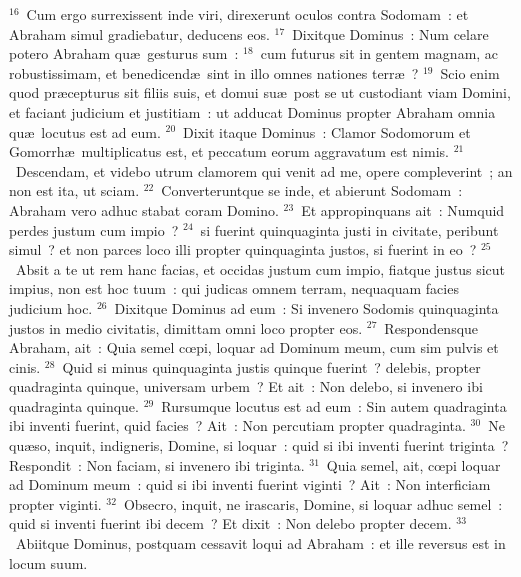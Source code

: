 ${}^{16}$~Cum ergo surrexissent inde viri, direxerunt oculos contra Sodomam~: et Abraham simul gradiebatur, deducens eos.
${}^{17}$~Dixitque Dominus~: Num celare potero Abraham qu\ae\ gesturus sum~:
${}^{18}$~cum futurus sit in gentem magnam, ac robustissimam, et benedicend\ae\ sint in illo omnes nationes terr\ae~?
${}^{19}$~Scio enim quod pr\ae cepturus sit filiis suis, et domui su\ae\ post se ut custodiant viam Domini, et faciant judicium et justitiam~: ut adducat Dominus propter Abraham omnia qu\ae\ locutus est ad eum.
${}^{20}$~Dixit itaque Dominus~: Clamor Sodomorum et Gomorrh\ae\ multiplicatus est, et peccatum eorum aggravatum est nimis.
${}^{21}$~Descendam, et videbo utrum clamorem qui venit ad me, opere compleverint~; an non est ita, ut sciam.
${}^{22}$~Converteruntque se inde, et abierunt Sodomam~: Abraham vero adhuc stabat coram Domino.
${}^{23}$~Et appropinquans ait~: Numquid perdes justum cum impio~?
${}^{24}$~si fuerint quinquaginta justi in civitate, peribunt simul~? et non parces loco illi propter quinquaginta justos, si fuerint in eo~?
${}^{25}$~Absit a te ut rem hanc facias, et occidas justum cum impio, fiatque justus sicut impius, non est hoc tuum~: qui judicas omnem terram, nequaquam facies judicium hoc.
${}^{26}$~Dixitque Dominus ad eum~: Si invenero Sodomis quinquaginta justos in medio civitatis, dimittam omni loco propter eos.
${}^{27}$~Respondensque Abraham, ait~: Quia semel cœpi, loquar ad Dominum meum, cum sim pulvis et cinis.
${}^{28}$~Quid si minus quinquaginta justis quinque fuerint~? delebis, propter quadraginta quinque, universam urbem~? Et ait~: Non delebo, si invenero ibi quadraginta quinque.
${}^{29}$~Rursumque locutus est ad eum~: Sin autem quadraginta ibi inventi fuerint, quid facies~? Ait~: Non percutiam propter quadraginta.
${}^{30}$~Ne qu\ae so, inquit, indigneris, Domine, si loquar~: quid si ibi inventi fuerint triginta~? Respondit~: Non faciam, si invenero ibi triginta.
${}^{31}$~Quia semel, ait, cœpi loquar ad Dominum meum~: quid si ibi inventi fuerint viginti~? Ait~: Non interficiam propter viginti.
${}^{32}$~Obsecro, inquit, ne irascaris, Domine, si loquar adhuc semel~: quid si inventi fuerint ibi decem~? Et dixit~: Non delebo propter decem.
${}^{33}$~Abiitque Dominus, postquam cessavit loqui ad Abraham~: et ille reversus est in locum suum.


